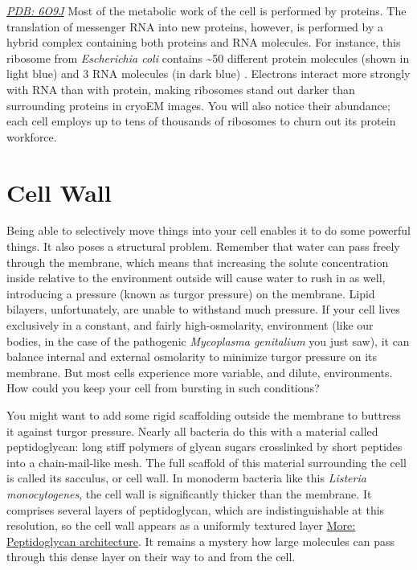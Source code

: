 \documentclass[]{tufte-book}
\begin{document}
\href{http://rcsb.org/structure/6O9J}{\emph{PDB: 6O9J}}
Most of the metabolic work of the cell is performed by proteins. The translation of messenger RNA into new proteins, however, is performed by a hybrid complex containing both proteins and RNA molecules. For instance, this ribosome from \emph{Escherichia coli} contains \textasciitilde{}50 different protein molecules (shown in light blue) and 3 RNA molecules (in dark blue) \citep{kaledhonkar2019}. Electrons interact more strongly with RNA than with protein, making ribosomes stand out darker than surrounding proteins in cryoEM images. You will also notice their abundance; each cell employs up to tens of thousands of ribosomes to churn out its protein workforce.

\hypertarget{cell-wall}{%
\section{Cell Wall}\label{cell-wall}}

Being able to selectively move things into your cell enables it to do some powerful things. It also poses a structural problem. Remember that water can pass freely through the membrane, which means that increasing the solute concentration inside relative to the environment outside will cause water to rush in as well, introducing a pressure (known as turgor pressure) on the membrane. Lipid bilayers, unfortunately, are unable to withstand much pressure. If your cell lives exclusively in a constant, and fairly high-osmolarity, environment (like our bodies, in the case of the pathogenic \emph{Mycoplasma genitalium} you just saw), it can balance internal and external osmolarity to minimize turgor pressure on its membrane. But most cells experience more variable, and dilute, environments. How could you keep your cell from bursting in such conditions?

You might want to add some rigid scaffolding outside the membrane to buttress it against turgor pressure. Nearly all bacteria do this with a material called peptidoglycan: long stiff polymers of glycan sugars crosslinked by short peptides into a chain-mail-like mesh. The full scaffold of this material surrounding the cell is called its sacculus, or cell wall. In monoderm bacteria like this \emph{Listeria monocytogenes}, the cell wall is significantly thicker than the membrane. It comprises several layers of peptidoglycan, which are indistinguishable at this resolution, so the cell wall appears as a uniformly textured layer \protect\hyperlink{Peptidoglycan_architecture}{More: Peptidoglycan architecture}. It remains a mystery how large molecules can pass through this dense layer on their way to and from the cell.
\end{document}
